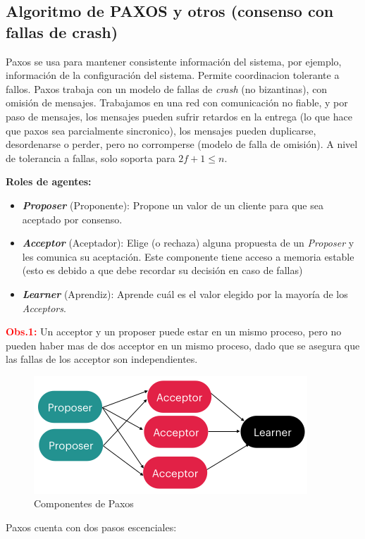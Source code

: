 \subsection{Algoritmo de PAXOS y otros (consenso con fallas de crash)}

Paxos se usa para mantener consistente información del sistema, por ejemplo, información de la configuración del sistema. Permite coordinacion tolerante a fallos. Paxos trabaja con un modelo de fallas de \textit{crash} (no bizantinas), con omisión de mensajes. Trabajamos en una red con comunicación no fiable, y por paso de mensajes, los mensajes pueden sufrir retardos en la entrega (lo que hace que paxos sea parcialmente sincronico), los mensajes pueden duplicarse, desordenarse o perder, pero no corromperse (modelo de falla de omisión). A nivel de tolerancia a fallas, solo soporta para $2f+1\leq n$.

\textbf{Roles de agentes:}
\begin{itemize}
    \item \textbf{\textit{Proposer}} (Proponente): Propone un valor de un cliente para que sea aceptado por consenso.
    \item \textbf{\textit{Acceptor}} (Aceptador): Elige (o rechaza) alguna propuesta de un \textit{Proposer} y les comunica su aceptación. Este componente tiene acceso a memoria estable (esto es debido a que debe recordar su decisión en caso de fallas)
    \item \textbf{\textit{Learner}} (Aprendiz): Aprende cuál es el valor elegido por la mayoría de los \textit{Acceptors}.
\end{itemize}

\textcolor{red}{\textbf{Obs.1:}} Un acceptor y un proposer puede estar en un mismo proceso, pero no pueden haber mas de dos acceptor en un mismo proceso, dado que se asegura que las fallas de los acceptor son independientes.

\begin{figure}[H]
    \centering
    \includegraphics[width=0.5\linewidth]{img/paxos_componentes.png}
    \caption{Componentes de Paxos}\label{fig:1761858653370}
\end{figure}

Paxos cuenta con dos pasos escenciales:


